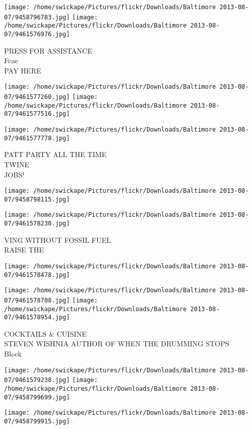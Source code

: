 \documentclass[10pt,letterpaper]{article}
\begin{document}
\vspace{0.25in}
\texttt{[image: /home/swickape/Pictures/flickr/Downloads/Baltimore 2013-08-07/9458796783.jpg]}
\texttt{[image: /home/swickape/Pictures/flickr/Downloads/Baltimore 2013-08-07/9461576976.jpg]}

PRESS FOR ASSISTANCE\\
Fcae\\
PAY HERE
\pagebreak

\texttt{[image: /home/swickape/Pictures/flickr/Downloads/Baltimore 2013-08-07/9461577260.jpg]}
\texttt{[image: /home/swickape/Pictures/flickr/Downloads/Baltimore 2013-08-07/9461577516.jpg]}

\texttt{[image: /home/swickape/Pictures/flickr/Downloads/Baltimore 2013-08-07/9461577778.jpg]}

PATT PARTY ALL THE TIME\\
TWINE\\
JOBS!
\pagebreak

\texttt{[image: /home/swickape/Pictures/flickr/Downloads/Baltimore 2013-08-07/9458798115.jpg]}

\vspace{0.25in}
\texttt{[image: /home/swickape/Pictures/flickr/Downloads/Baltimore 2013-08-07/9461578230.jpg]}

VING WITHOUT FOSSIL FUEL\\
RAISE THE
\pagebreak

\texttt{[image: /home/swickape/Pictures/flickr/Downloads/Baltimore 2013-08-07/9461578478.jpg]}

\vspace{0.25in}
\texttt{[image: /home/swickape/Pictures/flickr/Downloads/Baltimore 2013-08-07/9461578708.jpg]}
\texttt{[image: /home/swickape/Pictures/flickr/Downloads/Baltimore 2013-08-07/9461578954.jpg]}

COCKTAILS \& CUISINE\\
STEVEN WISHNIA AUTHOR OF WHEN THE DRUMMING STOPS\\
Block
\pagebreak

\texttt{[image: /home/swickape/Pictures/flickr/Downloads/Baltimore 2013-08-07/9461579238.jpg]}
\texttt{[image: /home/swickape/Pictures/flickr/Downloads/Baltimore 2013-08-07/9458799699.jpg]}

\vspace{0.25in}
\texttt{[image: /home/swickape/Pictures/flickr/Downloads/Baltimore 2013-08-07/9458799915.jpg]}
\end{document}
